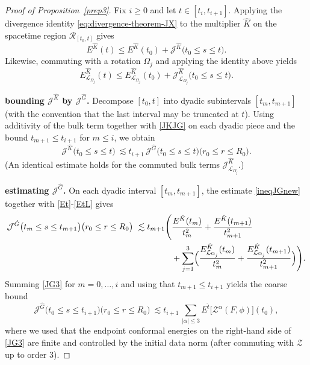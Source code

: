 \documentclass[11pt]{article}
\numberwithin{equation}{section}
\theoremstyle{plain}
\theoremstyle{definition}
\theoremstyle{remark}
\begin{document}
\begin{proof}[Proof of Proposition~\ref{prep3}]
Fix $i\ge 0$ and let $t\in[t_i,t_{i+1}]$.
Applying the divergence identity \eqref{eq:divergence-theorem-JX} to the multiplier $\hat K$ on the spacetime region $\mathcal R_{[t_0,t]}$ gives
\begin{equation}\label{ek1}
E^{\hat K}(t)
\le
E^{\hat K}(t_{0})
+
\mathcal{J}^{\hat K}\bigl(t_{0}\le s\le t\bigr).
\end{equation}
Likewise, commuting with a rotation $\Omega_j$ and applying the identity above yields
\begin{equation}\label{ek2}
E^{\hat K}_{\mathcal{L}_{\Omega_j}}(t)
\le
E^{\hat K}_{\mathcal{L}_{\Omega_j}}(t_{0})
+
\mathcal{J}^{\hat K}_{\mathcal{L}_{\Omega_j}}\bigl(t_{0}\le s\le t\bigr).
\end{equation}

\medskip
\noindent\textbf{bounding $\mathcal J^{\hat K}$ by $\mathcal J^{\hat G}$.}
Decompose $[t_0,t]$ into dyadic subintervals $[t_m,t_{m+1}]$ (with the convention that the last interval may be truncated at $t$).
Using additivity of the bulk term together with \eqref{JKJG} on each dyadic piece and the bound $t_{m+1}\le t_{i+1}$ for $m\le i$, we obtain
\begin{equation}\label{JKt0}
\mathcal{J}^{\hat K}\bigl(t_{0}\le s\le t\bigr)
\ \lesssim
t_{i+1}\,\mathcal{J}^{\hat G}\bigl(t_{0}\le s\le t\bigr)\bigl(r_{0}\le r\le R_{0}\bigr).
\end{equation}
(An identical estimate holds for the commuted bulk terms $\mathcal J^{\hat K}_{\mathcal L_{\Omega_j}}$.)

\medskip
\noindent\textbf{estimating $\mathcal J^{\hat G}$.}
On each dyadic interval $[t_m,t_{m+1}]$, the estimate \eqref{ineqJGnew} together with \eqref{Et}-\eqref{EtL} gives
\begin{eqnarray}\label{JG3}
\mathcal{J}^{\hat G}\bigl(t_{m}\le s\le t_{m+1}\bigr)\bigl(r_{0}\le r\le R_{0}\bigr)
\ \lesssim
t_{m+1}\Bigg(
&\frac{E^{\hat K}(t_{m})}{t_{m}^{2}}
+\frac{E^{\hat K}(t_{m+1})}{t_{m+1}^{2}}\\
&+\sum_{j=1}^{3}\Bigl(
\frac{E^{\hat K}_{\mathcal L_{\Omega_j}}(t_{m})}{t_{m}^{2}}
+\frac{E^{\hat K}_{\mathcal L_{\Omega_j}}(t_{m+1})}{t_{m+1}^{2}}
\Bigr)
\Bigg).
\end{eqnarray}
Summing \eqref{JG3} for $m=0,\dots,i$ and using that $t_{m+1}\le t_{i+1}$ yields the coarse bound
\begin{equation}\label{jgkecil}
\mathcal{J}^{\hat G}\bigl(t_{0}\le s\le t_{i+1}\bigr)\bigl(r_{0}\le r\le R_{0}\bigr)
\ \lesssim
t_{i+1}\,
\sum_{|\alpha|\le 3} E^{\hat t}\bigl[\mathcal Z^{\alpha}(F,\phi)\bigr](t_{0}),
\end{equation}
where we used that the endpoint conformal energies on the right-hand side of \eqref{JG3} are finite and controlled by the initial data norm (after commuting with $\mathcal Z$ up to order $3$).


\end{proof}
\end{document}
